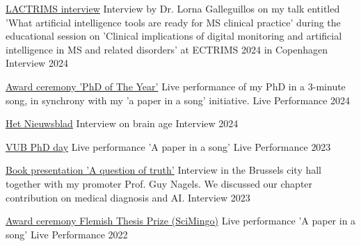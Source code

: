 \begin{cvhonors}
  \cvhonor
    {\href{https://apps.congrex.com/ectrims2024/en-GB/pag/presentation/360049}{LACTRIMS interview}} %
    {Interview by Dr. Lorna Galleguillos on my talk entitled 'What artificial intelligence tools are ready for MS clinical practice' during the educational session on 'Clinical implications of digital monitoring and artificial intelligence in MS and related disorders' at ECTRIMS 2024 in Copenhagen} %
    {Interview} %
    {2024} %

  \cvhonor
    {\href{https://www.youtube.com/watch?v=g00caqB9VlA}{Award ceremony 'PhD of The Year'}} %
    {Live performance of my PhD in a 3-minute song, in synchrony with my 'a paper in a song' initiative.} %
    {Live Performance} %
    {2024} %

  \cvhonor
    {\href{https://www.nieuwsblad.be/natuur-en-wetenschap/onze-man-gaat-onder-de-mri-scanner-en-laat-zijn-hersenleeftijd-bepalen-we-hebben-je-binnenste-gezien/55321745.html}{Het Nieuwsblad}} %
    {Interview on brain age} %
    {Interview} %
    {2024} %

  \cvhonor
    {\href{https://www.youtube.com/watch?v=R6r3SouhEjE}{VUB PhD day}} %
    {Live performance 'A paper in a song'} %
    {Live Performance} %
    {2023} %

  \cvhonor
    {\href{https://belux.edmo.eu/event/book-launch-a-question-of-truth/}{Book presentation 'A question of truth'}} %
    {Interview in the Brussels city hall together with my promoter Prof. Guy Nagels. We discussed our chapter contribution on medical diagnosis and AI.} %
    {Interview} %
    {2023} %

  \cvhonor
    {\href{https://x.com/SciMingo/status/1605284188780957698}{Award ceremony Flemish Thesis Prize (SciMingo)}} %
    {Live performance 'A paper in a song'} %
    {Live Performance} %
    {2022} %


\end{cvhonors}
